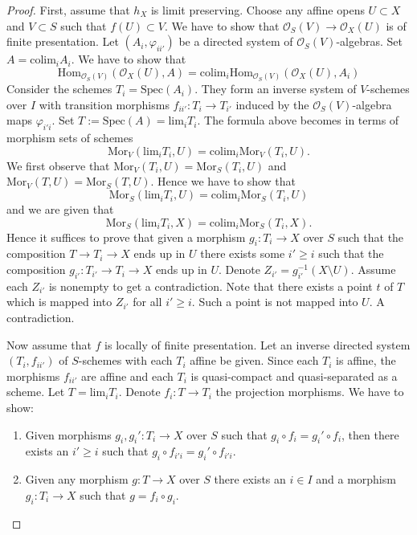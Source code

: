 \documentclass{article}
\begin{document}
\begin{proof}
    First, assume that $h_X$ is limit preserving. Choose any affine opens $U \subset X$ and $V\subset S $ such that $f(U) \subset V$. We have to show that $\mathcal{O}_S(V) \to \mathcal{O}_X(U)$ is of finite presentation. Let $(A_i, \varphi_{ii'})$ be a directed system of $\mathcal{O}_S(V)$-algebras. Set $A=\mathrm{colim}_i A_i$. We have to show that
    \[
        \mathrm{Hom}_{\mathcal{O}_S(V)} (\mathcal{O}_X(U),A) = \mathrm{colim}_i\mathrm{Hom}_{\mathcal{O}_S(V)}(\mathcal{O}_X(U),A_i)
    \]
    Consider the schemes $T_i=\mathrm{Spec}(A_i)$. They form an inverse system of $V$-schemes over $I$ with transition morphisms $f_{ii'}:T_i \to T_{i'}$ induced by the $\mathcal{O}_S(V)$-algebra maps $\varphi_{i'i}$. Set $T:=\mathrm{Spec}(A)=\mathrm{lim}_i T_i$. The formula above becomes in terms of morphism sets of schemes
    \[
        \mathrm{Mor}_V(\mathrm{lim}_i T_i,U) = \mathrm{colim}_i \mathrm{Mor}_V (T_i,U).
    \]
    We first observe that $\mathrm{Mor}_V(T_i,U)=\mathrm{Mor}_S(T_i,U)$ and $\mathrm{Mor}_V(T,U)=\mathrm{Mor}_S(T,U)$. Hence we have to show that
    \[
        \mathrm{Mor}_S(\mathrm{lim}_i T_i,U) = \mathrm{colim}_i \mathrm{Mor}_S(T_i,U)
    \]
    and we are given that
    \[
        \mathrm{Mor}_S(\mathrm{lim}_i T_i,X) = \mathrm{colim}_i \mathrm{Mor}_S(T_i,X).
    \]
    Hence it suffices to prove that given a morphism $g_i:T_i \to X$ over $S$ such that the composition $T \to T_i \to X$ ends up in $U$ there exists some $i' \ge i$ such that the composition $g_{i'}:T_{i'} \to T_i \to X$ ends up in $U$. Denote $Z_{i'}= g_{i'}^{-1}(X \setminus U)$. Assume each $Z_{i'}$ is nonempty to get a contradiction. Note that there exists a point $t$ of $T$ which is mapped into $Z_{i'}$ for all $i' \ge i$. Such a point is not mapped into $U$. A contradiction.

    Now assume that $f$ is locally of finite presentation. Let an inverse directed system $(T_i,f_{ii'})$ of $S$-schemes with each $T_i$ affine be given. Since each $T_i$ is affine, the morphisms $f_{ii'}$ are affine and each $T_i$ is quasi-compact and quasi-separated as a scheme. Let $T=\mathrm{lim}_i T_i$. Denote $f_i:T \to T_i$ the projection morphisms. We have to show:
    \begin{enumerate}[label=(\alph*)]
        \item Given morphisms $g_i,g_i':T_i \to X$ over $S$ such that $g_i \circ f_i=g_i' \circ f_i$, then there exists an $i' \ge i$ such that $g_i\circ f_{i'i}=g_i' \circ f_{i'i}$.
        \item Given any morphism $g:T \to X$ over $S$ there exists an $i \in I$ and a morphism $g_i:T_i \to X$ such that $g=f_i \circ g_i$.
    \end{enumerate}


\end{proof}
\end{document}
